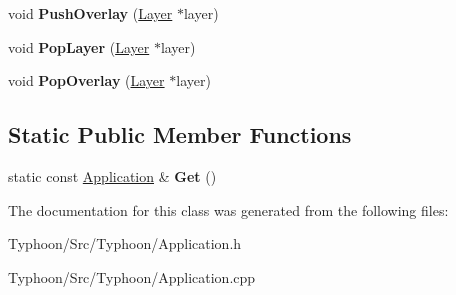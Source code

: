 \begin{DoxyCompactItemize}
void {\bfseries Push\+Overlay} (\mbox{\hyperlink{class_typhoon_engine_1_1_layer}{Layer}} $\ast$layer)
\item 
\mbox{\label{class_typhoon_engine_1_1_application_a32d21b1fb14d9974d1b966c449161ba7}} 
void {\bfseries Pop\+Layer} (\mbox{\hyperlink{class_typhoon_engine_1_1_layer}{Layer}} $\ast$layer)
\item 
\mbox{\label{class_typhoon_engine_1_1_application_af2a610dbff6b6740f285b04deb54280e}} 
void {\bfseries Pop\+Overlay} (\mbox{\hyperlink{class_typhoon_engine_1_1_layer}{Layer}} $\ast$layer)
\end{DoxyCompactItemize}
\subsection*{Static Public Member Functions}
\begin{DoxyCompactItemize}
\item 
\mbox{\label{class_typhoon_engine_1_1_application_acb646b61e36d9a3261fecdc09e5d7acf}} 
static const \mbox{\hyperlink{class_typhoon_engine_1_1_application}{Application}} \& {\bfseries Get} ()
\end{DoxyCompactItemize}


The documentation for this class was generated from the following files\+:\begin{DoxyCompactItemize}
\item 
Typhoon/\+Src/\+Typhoon/Application.\+h\item 
Typhoon/\+Src/\+Typhoon/Application.\+cpp\end{DoxyCompactItemize}
